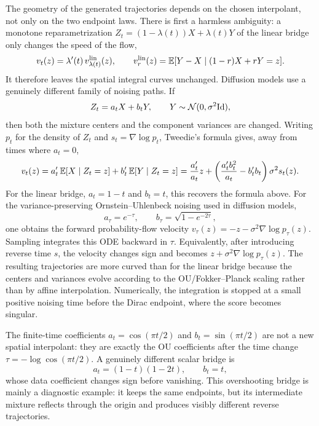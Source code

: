 The geometry of the generated trajectories depends on the chosen interpolant, not only on the two endpoint laws. There is first a harmless ambiguity: a monotone reparametrization $Z_t=(1-\lambda(t))X+\lambda(t)Y$ of the linear bridge only changes the speed of the flow,
\[
	v_t(z)=\lambda'(t)\,v^{\rm lin}_{\lambda(t)}(z),
	\qquad
	v^{\rm lin}_{r}(z)=\mathbb{E}[Y-X\mid (1-r)X+rY=z].
\]
It therefore leaves the spatial integral curves unchanged. Diffusion models use a genuinely different family of noising paths. If
\[
	Z_t=a_tX+b_tY,\qquad Y\sim\mathcal{N}(0,\sigma^2\mathrm{Id}),
\]
then both the mixture centers and the component variances are changed. Writing $p_t$ for the density of $Z_t$ and $s_t=\nabla\log p_t$, Tweedie's formula gives, away from times where $a_t=0$,
\[
	v_t(z)=a'_t\,\mathbb{E}[X\mid Z_t=z]+b'_t\,\mathbb{E}[Y\mid Z_t=z]
	=\frac{a'_t}{a_t}z+
	\left(\frac{a'_tb_t^2}{a_t}-b'_tb_t\right)\sigma^2s_t(z).
\]
For the linear bridge, $a_t=1-t$ and $b_t=t$, this recovers the formula above. For the variance-preserving Ornstein--Uhlenbeck noising used in diffusion models,
\[
	a_\tau=e^{-\tau},\qquad b_\tau=\sqrt{1-e^{-2\tau}},
\]
one obtains the forward probability-flow velocity $v_\tau(z)=-z-\sigma^2\nabla\log p_\tau(z)$. Sampling integrates this ODE backward in $\tau$. Equivalently, after introducing reverse time $s$, the velocity changes sign and becomes $z+\sigma^2\nabla\log p_\tau(z)$. The resulting trajectories are more curved than for the linear bridge because the centers and variances evolve according to the OU/Fokker--Planck scaling rather than by affine interpolation. Numerically, the integration is stopped at a small positive noising time before the Dirac endpoint, where the score becomes singular.

The finite-time coefficients $a_t=\cos(\pi t/2)$ and $b_t=\sin(\pi t/2)$ are not a new spatial interpolant: they are exactly the OU coefficients after the time change $\tau=-\log\cos(\pi t/2)$. A genuinely different scalar bridge is
\[
	a_t=(1-t)(1-2t),
	\qquad
	b_t=t,
\]
whose data coefficient changes sign before vanishing. This overshooting bridge is mainly a diagnostic example: it keeps the same endpoints, but its intermediate mixture reflects through the origin and produces visibly different reverse trajectories.

